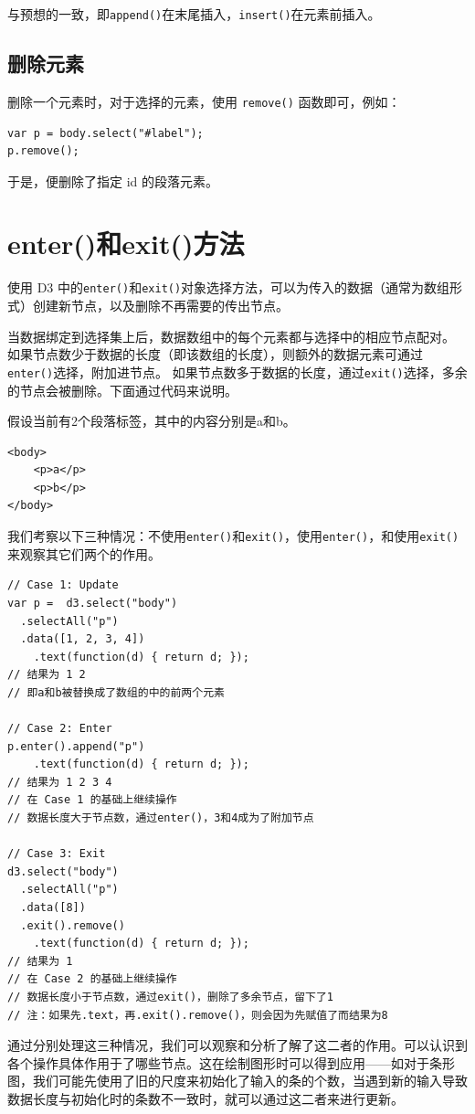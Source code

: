 与预想的一致，即\verb|append()|在末尾插入，\verb|insert()|在元素前插入。

\subsection{删除元素}

删除一个元素时，对于选择的元素，使用 \verb|remove()| 函数即可，例如：

\begin{verbatim}
var p = body.select("#label");
p.remove();
\end{verbatim}

于是，便删除了指定 id 的段落元素。

\section{enter()和exit()方法}

使用 D3 中的\verb|enter()|和\verb|exit()|对象选择方法，可以为传入的数据（通常为数组形式）创建新节点，以及删除不再需要的传出节点。

当数据绑定到选择集上后，数据数组中的每个元素都与选择中的相应节点配对。 如果节点数少于数据的长度（即该数组的长度），则额外的数据元素可通过\verb|enter()|选择，附加进节点。 如果节点数多于数据的长度，通过\verb|exit()|选择，多余的节点会被删除。下面通过代码来说明。

假设当前有2个段落标签，其中的内容分别是a和b。

\begin{verbatim}
<body>
    <p>a</p>
    <p>b</p>
</body>
\end{verbatim}

我们考察以下三种情况：不使用\verb|enter()|和\verb|exit()|，使用\verb|enter()|，和使用\verb|exit()|来观察其它们两个的作用。

\begin{verbatim}
// Case 1: Update
var p =  d3.select("body")
  .selectAll("p")
  .data([1, 2, 3, 4])
    .text(function(d) { return d; });
// 结果为 1 2
// 即a和b被替换成了数组的中的前两个元素

// Case 2: Enter
p.enter().append("p")
    .text(function(d) { return d; });
// 结果为 1 2 3 4
// 在 Case 1 的基础上继续操作
// 数据长度大于节点数，通过enter()，3和4成为了附加节点

// Case 3: Exit
d3.select("body")
  .selectAll("p")
  .data([8])
  .exit().remove()
    .text(function(d) { return d; });
// 结果为 1
// 在 Case 2 的基础上继续操作
// 数据长度小于节点数，通过exit()，删除了多余节点，留下了1
// 注：如果先.text，再.exit().remove()，则会因为先赋值了而结果为8
\end{verbatim}

通过分别处理这三种情况，我们可以观察和分析了解了这二者的作用。可以认识到各个操作具体作用于了哪些节点。这在绘制图形时可以得到应用——如对于条形图，我们可能先使用了旧的尺度来初始化了输入的条的个数，当遇到新的输入导致数据长度与初始化时的条数不一致时，就可以通过这二者来进行更新。